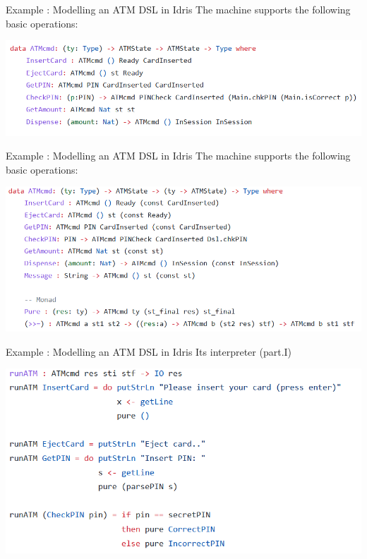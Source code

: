 \documentclass{beamer}
\newcommand{\dsltitle}{Example : Modelling an ATM DSL in Idris}
\begin{document}
\begin{frame}[fragile]{\dsltitle}
The machine supports the following basic operations:
\begin{center}
	\includegraphics[width=\textwidth]{pics/dsl-code-2}
\end{center}
\end{frame}

\begin{frame}[fragile]{\dsltitle}
The machine supports the following basic operations:
\begin{center}
	\includegraphics[width=\textwidth]{pics/dsl-code-3}
\end{center}
\end{frame}

\begin{frame}[fragile]{\dsltitle}
Its interpreter (part.I)
\begin{center}
	\includegraphics[width=\textwidth]{pics/dsl-code-4_1}
\end{center}
\end{frame}
\end{document}

